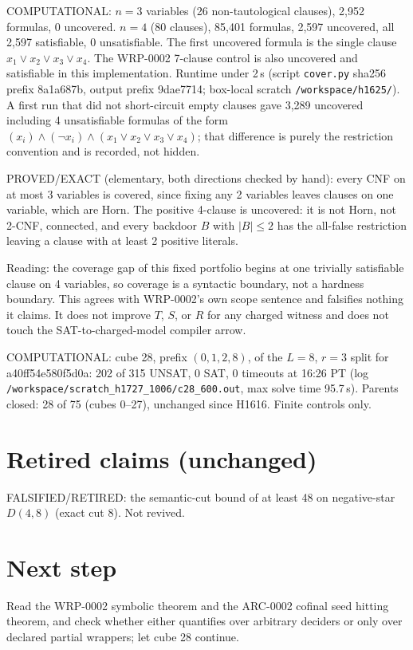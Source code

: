 \documentclass[11pt]{article}
\begin{document}
COMPUTATIONAL: $n=3$ variables (26 non-tautological clauses), 2{,}952 formulas, 0 uncovered. $n=4$ (80 clauses), 85{,}401 formulas, 2{,}597 uncovered, all 2{,}597 satisfiable, 0 unsatisfiable. The first uncovered formula is the single clause $x_1\vee x_2\vee x_3\vee x_4$. The WRP-0002 7-clause control is also uncovered and satisfiable in this implementation. Runtime under 2\,s (script \texttt{cover.py} sha256 prefix 8a1a687b, output prefix 9dae7714; box-local scratch \texttt{/workspace/h1625/}). A first run that did not short-circuit empty clauses gave 3{,}289 uncovered including 4 unsatisfiable formulas of the form $(x_i)\wedge(\neg x_i)\wedge(x_1\vee x_2\vee x_3\vee x_4)$; that difference is purely the restriction convention and is recorded, not hidden.

PROVED/EXACT (elementary, both directions checked by hand): every CNF on at most 3 variables is covered, since fixing any 2 variables leaves clauses on one variable, which are Horn. The positive 4-clause is uncovered: it is not Horn, not 2-CNF, connected, and every backdoor $B$ with $|B|\le 2$ has the all-false restriction leaving a clause with at least 2 positive literals.

Reading: the coverage gap of this fixed portfolio begins at one trivially satisfiable clause on 4 variables, so coverage is a syntactic boundary, not a hardness boundary. This agrees with WRP-0002's own scope sentence and falsifies nothing it claims. It does not improve $T$, $S$, or $R$ for any charged witness and does not touch the SAT-to-charged-model compiler arrow.

COMPUTATIONAL: cube 28, prefix $(0,1,2,8)$, of the $L=8$, $r=3$ split for a40ff54e580f5d0a: 202 of 315 UNSAT, 0 SAT, 0 timeouts at 16:26 PT (log \texttt{/workspace/scratch\_h1727\_1006/c28\_600.out}, max solve time 95.7\,s). Parents closed: 28 of 75 (cubes 0--27), unchanged since H1616. Finite controls only.

\section*{Retired claims (unchanged)}
FALSIFIED/RETIRED: the semantic-cut bound of at least 48 on negative-star $D(4,8)$ (exact cut 8). Not revived.

\section*{Next step}
Read the WRP-0002 symbolic theorem and the ARC-0002 cofinal seed hitting theorem, and check whether either quantifies over arbitrary deciders or only over declared partial wrappers; let cube 28 continue.
\end{document}
